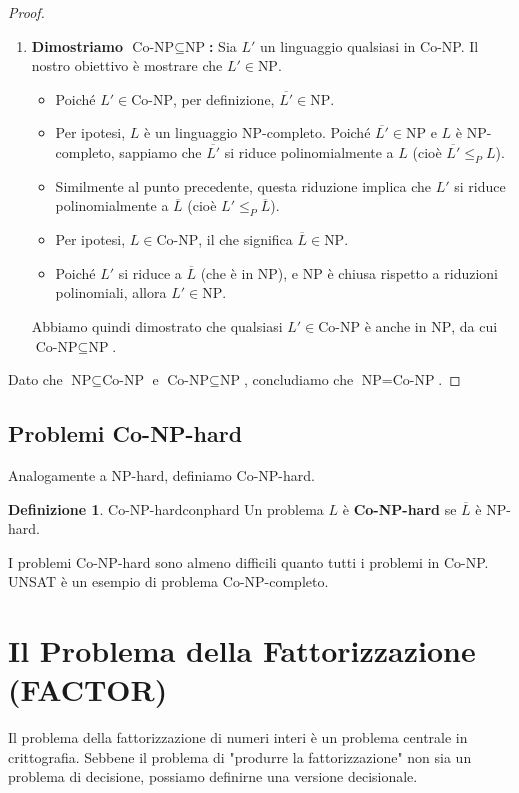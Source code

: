 \documentclass[a4paper]{article}
\theoremstyle{definition} %
\newtheorem{definition}{Definizione}
\begin{document}
\begin{proof}
\begin{enumerate}
    \item \textbf{Dimostriamo $\text{Co-NP} \subseteq \text{NP}$:}
    Sia $L'$ un linguaggio qualsiasi in Co-NP. Il nostro obiettivo è mostrare che $L' \in \text{NP}$.
    \begin{itemize}
        \item Poiché $L' \in \text{Co-NP}$, per definizione, $\overline{L'} \in \text{NP}$.
        \item Per ipotesi, $L$ è un linguaggio NP-completo. Poiché $\overline{L'} \in \text{NP}$ e $L$ è NP-completo, sappiamo che $\overline{L'}$ si riduce polinomialmente a $L$ (cioè $\overline{L'} \le_P L$).
        \item Similmente al punto precedente, questa riduzione implica che $L'$ si riduce polinomialmente a $\overline{L}$ (cioè $L' \le_P \overline{L}$).
        \item Per ipotesi, $L \in \text{Co-NP}$, il che significa $\overline{L} \in \text{NP}$.
        \item Poiché $L'$ si riduce a $\overline{L}$ (che è in NP), e NP è chiusa rispetto a riduzioni polinomiali, allora $L' \in \text{NP}$.
    \end{itemize}
    Abbiamo quindi dimostrato che qualsiasi $L' \in \text{Co-NP}$ è anche in $\text{NP}$, da cui $\text{Co-NP} \subseteq \text{NP}$.
\end{enumerate}
Dato che $\text{NP} \subseteq \text{Co-NP}$ e $\text{Co-NP} \subseteq \text{NP}$, concludiamo che $\text{NP} = \text{Co-NP}$.
\end{proof}

\subsection{Problemi Co-NP-hard}
Analogamente a NP-hard, definiamo Co-NP-hard.
\begin{definition}{Co-NP-hard}{conphard}
Un problema $L$ è \textbf{Co-NP-hard} se $\overline{L}$ è NP-hard.
\end{definition}
I problemi Co-NP-hard sono almeno difficili quanto tutti i problemi in Co-NP. UNSAT è un esempio di problema Co-NP-completo.

\section{Il Problema della Fattorizzazione (FACTOR)}

Il problema della fattorizzazione di numeri interi è un problema centrale in crittografia. Sebbene il problema di "produrre la fattorizzazione" non sia un problema di decisione, possiamo definirne una versione decisionale.
\end{document}
